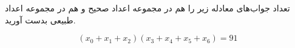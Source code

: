 \EXERCISE
تعداد جواب‌های معادله زیر را هم در مجموعه اعداد صحیح و هم در مجموعه اعداد طبیعی بدست آورید.

$$(x_0 + x_1 + x_2)(x_3 + x_4 + x_5 + x_6) = 91$$
